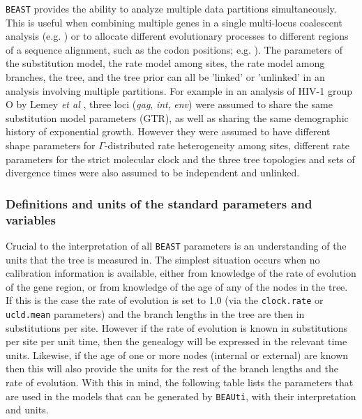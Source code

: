 \documentclass[cup7b, english]{cupbook}
\begin{document}
\texttt{BEAST} provides the ability to analyze multiple data partitions simultaneously.
This is useful when combining multiple genes in a single multi-locus
coalescent analysis (e.g. \cite{Lemeyetal2004}) or to allocate different
evolutionary processes to different regions of a sequence alignment, such as the codon positions; e.g. \cite{PDNRR2003}). The parameters
of the substitution model, the rate model among sites, the rate model
among branches, the tree, and the tree prior can all be 'linked' or
'unlinked' in an analysis involving multiple partitions. For example
in an analysis of HIV-1 group O by Lemey \emph{et al} \cite{Lemeyetal2004},
three loci ({\it gag}, {\it int}, {\it env}) were assumed to share the same substitution
model parameters (GTR), as well as sharing the same demographic history
of exponential growth. However they were assumed to have different
shape parameters for $\Gamma$-distributed rate heterogeneity among
sites, different rate parameters for the strict molecular clock and
the three tree topologies and sets of divergence times were also assumed
to be independent and unlinked.

\subsubsection{Definitions and units of the standard parameters and variables}

Crucial to the interpretation of all \texttt{BEAST} parameters is an understanding of
the units that the tree is measured in. The simplest situation occurs when no
calibration information is available, either from knowledge of the rate of
evolution of the gene region, or from knowledge of the age of any of the nodes
in the tree. If this is the case the rate of evolution is set to 1.0 (via the
\texttt{\small{clock.rate}} or \texttt{\small{ucld.mean}} parameters) and the
branch lengths in the tree are then in substitutions per site. However if the
rate of evolution is known in substitutions per site per unit time, then the
genealogy will be expressed in the relevant time units. Likewise, if the age
of one or more nodes (internal or external) are known then this will also
provide the units for the rest of the branch lengths and the rate of evolution.
With this in mind, the following table lists the parameters that are used in
the models that can be generated by \texttt{BEAUti}, with their interpretation and units.
\end{document}
